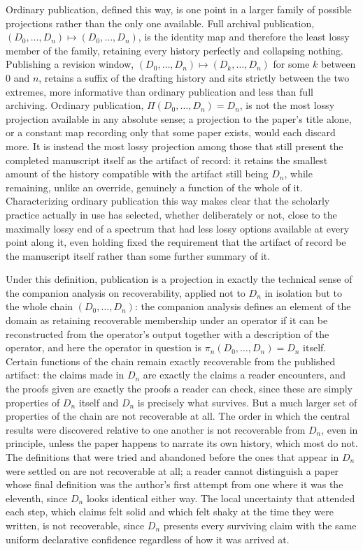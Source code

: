 \documentclass[11pt]{article}
\begin{document}
Ordinary publication, defined this way, is one point in a larger family of possible projections rather than the only one available. Full archival publication, $(D_0, \ldots, D_n) \mapsto (D_0, \ldots, D_n)$, is the identity map and therefore the least lossy member of the family, retaining every history perfectly and collapsing nothing. Publishing a revision window, $(D_0, \ldots, D_n) \mapsto (D_k, \ldots, D_n)$ for some $k$ between $0$ and $n$, retains a suffix of the drafting history and sits strictly between the two extremes, more informative than ordinary publication and less than full archiving. Ordinary publication, $\Pi(D_0, \ldots, D_n) = D_n$, is not the most lossy projection available in any absolute sense; a projection to the paper's title alone, or a constant map recording only that some paper exists, would each discard more. It is instead the most lossy projection among those that still present the completed manuscript itself as the artifact of record: it retains the smallest amount of the history compatible with the artifact still being $D_n$, while remaining, unlike an override, genuinely a function of the whole of it. Characterizing ordinary publication this way makes clear that the scholarly practice actually in use has selected, whether deliberately or not, close to the maximally lossy end of a spectrum that had less lossy options available at every point along it, even holding fixed the requirement that the artifact of record be the manuscript itself rather than some further summary of it.

Under this definition, publication is a projection in exactly the technical sense of the companion analysis on recoverability, applied not to $D_n$ in isolation but to the whole chain $(D_0, \ldots, D_n)$: the companion analysis defines an element of the domain as retaining recoverable membership under an operator if it can be reconstructed from the operator's output together with a description of the operator, and here the operator in question is $\pi_n(D_0, \ldots, D_n) = D_n$ itself. Certain functions of the chain remain exactly recoverable from the published artifact: the claims made in $D_n$ are exactly the claims a reader encounters, and the proofs given are exactly the proofs a reader can check, since these are simply properties of $D_n$ itself and $D_n$ is precisely what survives. But a much larger set of properties of the chain are not recoverable at all. The order in which the central results were discovered relative to one another is not recoverable from $D_n$, even in principle, unless the paper happens to narrate its own history, which most do not. The definitions that were tried and abandoned before the ones that appear in $D_n$ were settled on are not recoverable at all; a reader cannot distinguish a paper whose final definition was the author's first attempt from one where it was the eleventh, since $D_n$ looks identical either way. The local uncertainty that attended each step, which claims felt solid and which felt shaky at the time they were written, is not recoverable, since $D_n$ presents every surviving claim with the same uniform declarative confidence regardless of how it was arrived at.
\end{document}
